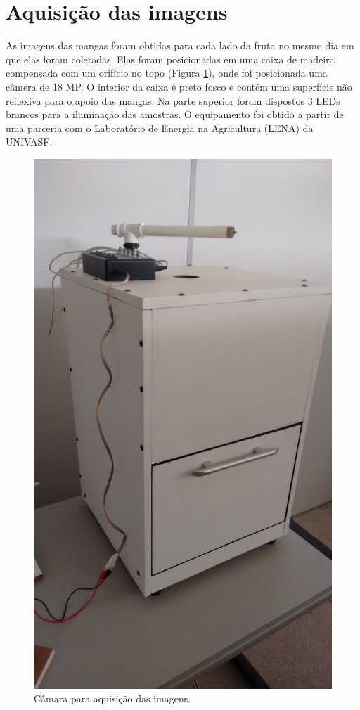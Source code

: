 \section{Aquisição das imagens}

As imagens das mangas foram obtidas para cada lado da fruta no mesmo dia em que elas foram coletadas. Elas foram posicionadas em uma caixa de madeira compensada com um orifício no topo (Figura \ref{img:caixa}), onde foi posicionada uma câmera de 18 MP. O interior da caixa é preto fosco e contém uma superfície não reflexiva para o apoio das mangas. Na parte superior foram dispostos 3 LEDs brancos para a iluminação das amostras. O equipamento foi obtido a partir de uma parceria com o Laboratório de Energia na Agricultura (LENA) da UNIVASF. 

\begin{figure}[H]
\centering
	\caption{Câmara para aquisição das imagens.}\label{img:caixa}
	\includegraphics[scale=0.1]{img/caixa.jpg}
\end{figure}

